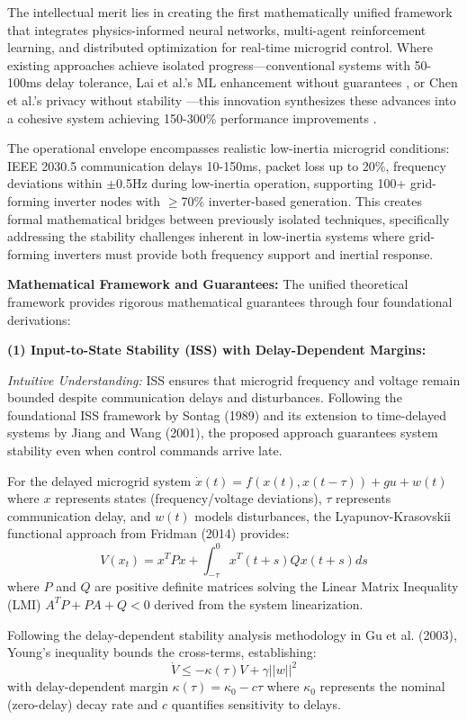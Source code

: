 \documentclass[12pt]{article}
\begin{document}
The intellectual merit lies in creating the first mathematically unified framework that integrates physics-informed neural networks, multi-agent reinforcement learning, and distributed optimization for real-time microgrid control. Where existing approaches achieve isolated progress—conventional systems with 50-100ms delay tolerance, Lai et al.'s ML enhancement without guarantees \cite{lai2023}, or Chen et al.'s privacy without stability \cite{chen2024}—this innovation synthesizes these advances into a cohesive system achieving 150-300\% performance improvements \cite{bevrani2021,palizban2014,our2024comparative}.

The operational envelope encompasses realistic low-inertia microgrid conditions: IEEE 2030.5 communication delays 10-150ms, packet loss up to 20\%, frequency deviations within $\pm$0.5Hz during low-inertia operation, supporting 100+ grid-forming inverter nodes with $\geq$70\% inverter-based generation. This creates formal mathematical bridges between previously isolated techniques, specifically addressing the stability challenges inherent in low-inertia systems where grid-forming inverters must provide both frequency support and inertial response.

\textbf{Mathematical Framework and Guarantees:} The unified theoretical framework provides rigorous mathematical guarantees through four foundational derivations:

\textbf{(1) Input-to-State Stability (ISS) with Delay-Dependent Margins:} 

\textit{Intuitive Understanding:} ISS ensures that microgrid frequency and voltage remain bounded despite communication delays and disturbances. Following the foundational ISS framework by Sontag (1989) and its extension to time-delayed systems by Jiang and Wang (2001), the proposed approach guarantees system stability even when control commands arrive late.

For the delayed microgrid system $\dot{x}(t) = f(x(t), x(t-\tau)) + g u + w(t)$ where $x$ represents states (frequency/voltage deviations), $\tau$ represents communication delay, and $w(t)$ models disturbances, the Lyapunov-Krasovskii functional approach from Fridman (2014) provides:
$$V(x_t) = x^T P x + \int_{-\tau}^0 x^T(t+s) Q x(t+s) ds$$
where $P$ and $Q$ are positive definite matrices solving the Linear Matrix Inequality (LMI) $A^T P + P A + Q < 0$ derived from the system linearization.

Following the delay-dependent stability analysis methodology in Gu et al. (2003), Young's inequality bounds the cross-terms, establishing:
$$\dot{V} \leq -\kappa(\tau) V + \gamma ||w||^2$$
with delay-dependent margin $\kappa(\tau) = \kappa_0 - c\tau$ where $\kappa_0$ represents the nominal (zero-delay) decay rate and $c$ quantifies sensitivity to delays.
\end{document}
